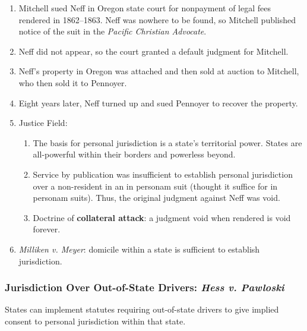 \begin{enumerate}
    \item Mitchell sued Neff in Oregon state court for nonpayment of legal 
    fees rendered in 1862--1863. Neff was nowhere to be found, so Mitchell 
    published notice of the suit in the \emph{Pacific Christian Advocate}.
    \item Neff did not appear, so the court granted a default judgment for 
    Mitchell.
    \item Neff's property in Oregon was attached and then sold at auction to 
    Mitchell, who then sold it to Pennoyer.
    \item Eight years later, Neff turned up and sued Pennoyer to recover the 
    property.
    \item Justice Field:
    \begin{enumerate}
        \item The basis for personal jurisdiction is a state's territorial 
        power. States are all-powerful within their borders and powerless 
        beyond.
        \item Service by publication was insufficient to establish personal 
        jurisdiction over a non-resident in an in personam suit (thought it 
        suffice for in personam suits). Thus, the original judgment against 
        Neff was void.
        \item Doctrine of \textbf{collateral attack}: a judgment void when 
        rendered is void forever.
    \end{enumerate}
    \item \emph{Milliken v. Meyer}: domicile within a state is sufficient to 
    establish jurisdiction.
\end{enumerate}

\subsubsection{Jurisdiction Over Out-of-State Drivers: \emph{Hess v. 
Pawloski}}

States can implement statutes requiring out-of-state drivers to give implied 
consent to personal jurisdiction within that state.

